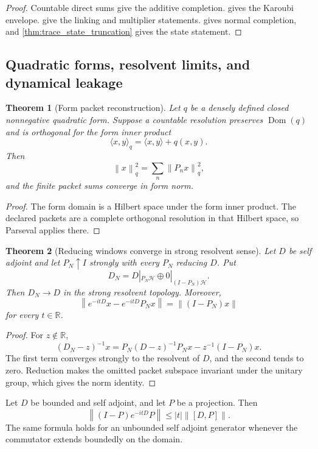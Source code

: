 \documentclass{aomart}
\newtheorem{theorem}{Theorem}[section]
\theoremstyle{definition}
\theoremstyle{remark}
\newcommand{\RR}{\mathbb R}
\newcommand{\Hh}{\mathcal H}
\newcommand{\Dom}{\operatorname{Dom}}
\newcommand{\norm}[1]{\left\lVert#1\right\rVert}
\begin{document}
\begin{proof}
Countable direct sums give the additive completion.  gives the Karoubi envelope.  give the linking and multiplier statements.  gives normal completion, and \cref{thm:trace_state_truncation} gives the state statement.
\end{proof}

\subsection{Quadratic forms, resolvent limits, and dynamical leakage}

\begin{theorem}[Form packet reconstruction]\label{thm:form_packet_reconstruction}
Let \(q\) be a densely defined closed nonnegative quadratic form. Suppose a countable resolution preserves \(\Dom(q)\) and is orthogonal for the form inner product
\[
 \langle x,y\rangle_q
 =
 \langle x,y\rangle+q(x,y).
\]
Then
\[
 \boxed{
 \norm{x}_q^2
 =
 \sum_n\norm{P_nx}_q^2,
 }
\]
and the finite packet sums converge in form norm.
\end{theorem}

\begin{proof}
The form domain is a Hilbert space under the form inner product. The declared packets are a complete orthogonal resolution in that Hilbert space, so Parseval applies there.
\end{proof}

\begin{theorem}[Reducing windows converge in strong resolvent sense]\label{thm:strong_resolvent_windows}
Let \(D\) be self adjoint and let \(P_N\uparrow I\) strongly with every \(P_N\) reducing \(D\). Put
\[
 D_N
 =
 D|_{P_N\Hh}\oplus0|_{(I-P_N)\Hh}.
\]
Then \(D_N\to D\) in the strong resolvent topology. Moreover,
\[
 \boxed{
 \norm{e^{-itD}x-e^{-itD}P_Nx}
 =
 \norm{(I-P_N)x}
 }
\]
for every \(t\in\RR\).
\end{theorem}

\begin{proof}
For \(z\notin\RR\),
\[
 (D_N-z)^{-1}x
 =
 P_N(D-z)^{-1}P_Nx-z^{-1}(I-P_N)x.
\]
The first term converges strongly to the resolvent of \(D\), and the second tends to zero. Reduction makes the omitted packet subspace invariant under the unitary group, which gives the norm identity.
\end{proof}

\begin{proposition}\label{prop:dynamical_leakage}
Let \(D\) be bounded and self adjoint, and let \(P\) be a projection. Then
\[
 \boxed{
 \norm{(I-P)e^{-itD}P}
 \leq
 |t|\norm{[D,P]}.
 }
\]
The same formula holds for an unbounded self adjoint generator whenever the commutator extends boundedly on the domain.
\end{proposition}
\end{document}

